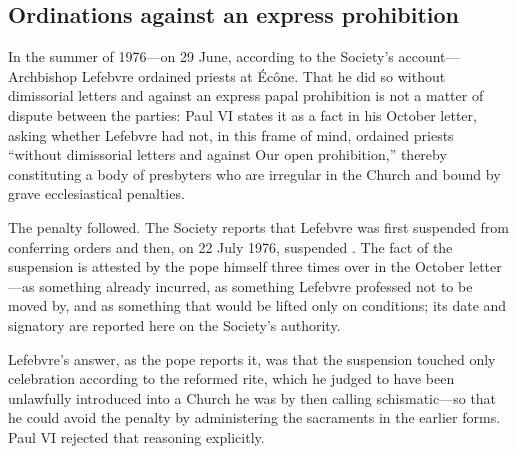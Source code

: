\subsection{Ordinations against an express prohibition}

In the summer of 1976---on 29 June, according to the Society's
account---Archbishop Lefebvre ordained priests at Écône. That he did so
without dimissorial letters and against an express papal prohibition is
not a matter of dispute between the parties: Paul VI states it as a fact
in his October letter, asking whether Lefebvre had not, in this frame of
mind, ordained priests ``without dimissorial letters and against Our open
prohibition,'' thereby constituting a body of presbyters who are
irregular in the Church and bound by grave ecclesiastical
penalties.

The penalty followed. The Society reports that Lefebvre was first
suspended from conferring orders and then, on 22 July 1976, suspended
. The fact of the suspension  is
attested by the pope himself three times over in the October letter---as
something already incurred, as something Lefebvre professed not to be
moved by, and as something that would be lifted only on conditions; its
date and signatory are reported here on the Society's
authority.

Lefebvre's answer, as the pope reports it, was that the suspension
touched only celebration according to the reformed rite, which he judged
to have been unlawfully introduced into a Church he was by then calling
schismatic---so that he could avoid the penalty by administering the
sacraments in the earlier forms. Paul VI rejected that reasoning
explicitly.


